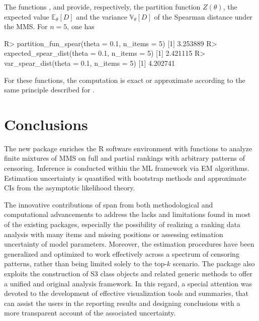 The functions ,   and  provide, respectively, the partition function $Z(\theta)$, the expected value $\mathbb{E}_{\theta}[D]$ and the variance $\mathbb{V}_{\theta}[D]$ of the Spearman distance under the MMS. For $n=5$, one has
\begin{example}
R> partition_fun_spear(theta = 0.1, n_items = 5)
[1] 3.253889
R> expected_spear_dist(theta = 0.1, n_items = 5)
[1] 2.421115
R> var_spear_dist(theta = 0.1, n_items = 5)
[1] 4.202741
\end{example}
For these functions, the computation is exact or approximate according to the same principle described for .


\section{Conclusions}
\label{sec:concl}
The new  package enriches the \textsf{R} software environment with functions to analyze finite mixtures of MMS on full and partial rankings with arbitrary patterns of censoring. Inference is conducted within the ML framework via EM algorithms. Estimation uncertainty is quantified with bootstrap methods and approximate CIs from the asymptotic likelihood theory. 

The innovative contributions of  span from both methodological and computational advancements to address the lacks and limitations found in most of the existing packages, especially the possibility of realizing a ranking data analysis with many items and missing positions or assessing estimation uncertainty of model parameters. Moreover, the estimation procedures have been generalized and optimized to work effectively across a spectrum of censoring patterns, rather than being limited solely to the top-$k$ scenario. 
The package also exploits the construction of S3 class objects and related generic methods to offer a unified and original analysis framework. In this regard, a special attention was devoted to the development of effective visualization tools and summaries, that can assist the users in the reporting results and designing conclusions with a more transparent account of the associated uncertainty. 

